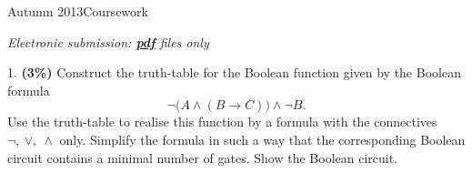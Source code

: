 \documentclass[11pt]{article}
\begin{document}
\qquad Autumn 
2013\hfill{\large\sf Coursework}

\bigskip
\begin{center}
\end{center}

\mbox{} \hfill {\em Electronic submission: \underline{\bf pdf} files only}



\vspace{1.5cm} 
\noindent
%
1. {\bf (3\%)}  Construct the truth-table for the Boolean function given by the Boolean formula
%
$$
\neg \big(A \land (B \to C)\big) \land \neg B.
$$
%
Use the truth-table to realise this function by a formula with the  connectives $\neg,\ \lor,\ \land$ only. Simplify the formula in such a way that the corresponding Boolean circuit contains a minimal number of gates. Show the Boolean circuit.
\end{document}
